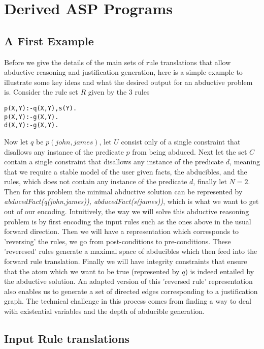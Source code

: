 \section{Derived ASP Programs}\label{sec:derived_asp}
\subsection{A First Example}
Before we give the details of the main sets of rule translations that allow
abductive reasoning and justification generation, here is a simple example to
illustrate some key ideas and what the desired output for an abductive problem
is. Consider the rule set $R$ given by the 3 rules
\begin{lstlisting}[frame=none]
p(X,Y):-q(X,Y),s(Y).
p(X,Y):-g(X,Y).
d(X,Y):-g(X,Y).
\end{lstlisting}
Now let $q$ be $p(john,james)$, let $U$ consist only of a single constraint that disallows any
instance of the predicate $p$ from being abduced. Next let the set
$C$ contain a single constraint that disallows any instance of the predicate 
$d$, meaning that we require a stable
model of the user given facts, the abducibles, and the rules, which does not
contain any instance of the predicate $d$, finally let $N = 2$. Then for this
problem the minimal abductive solution can be represented by
\textit{abducedFact(q(john,james)), abducedFact(s(james))}, which is what we
want to get out of our encoding. Intuitively, the way we will solve this
abductive reasoning problem is by first encoding the input rules such as the
ones above in the usual forward direction. Then we will have a representation which
corresponds to 'reversing' the rules, \ie we go from post-conditions to
pre-conditions. These 'reveresed' rules
generate a maximal space of abducibles which then feed into the forward rule
translation. Finally we will have integrity constraints that ensure that the
atom which we want to be true (represented by $q$) is indeed entailed by the
abductive solution. An adapted version of this 'reversed rule' representation
also enables us to generate a set of directed edges corresponding to a
justification graph. The technical challenge in this process comes from
finding a way to deal with existential variables and the depth of abducible generation.

\subsection{Input Rule translations}

